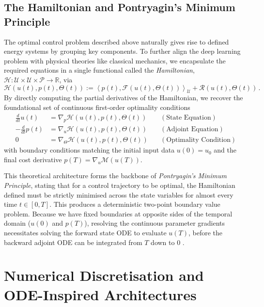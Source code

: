 \subsection{The Hamiltonian and Pontryagin's Minimum Principle}

The optimal control problem described above naturally gives rise to defined energy systems by grouping key components. To further align the deep learning problem with physical theories like classical mechanics, we encapsulate the required equations in a single functional called the \emph{Hamiltonian}, $\mathcal{H}: \mathcal{U} \times \mathcal{U} \times \mathcal{P} \to \mathbb{R}$, via
\begin{equation*}
    \mathcal{H}\left(u(t), p(t), \Theta(t)\right) := \left\langle p(t), \mathcal{F}\left(u(t), \Theta(t)\right) \right\rangle_{\mathcal{U}} + \mathcal{R}\left(u(t), \Theta(t)\right) \, .
\end{equation*}
By directly computing the partial derivatives of the Hamiltonian, we recover the foundational set of continuous first-order optimality conditions
\begin{align*}
    \frac{d}{dt} u(t) &= \nabla_p \mathcal{H}\left(u(t), p(t), \Theta(t)\right) &\quad (\text{State Equation}) \\
    -\frac{d}{dt} p(t) &= \nabla_u \mathcal{H}\left(u(t), p(t), \Theta(t)\right) &\quad (\text{Adjoint Equation}) \\
    0 &= \nabla_\Theta \mathcal{H}\left(u(t), p(t), \Theta(t)\right) &\quad (\text{Optimality Condition}) 
\end{align*}
with boundary conditions matching the initial input data $u(0) = u_0$ and the final cost derivative $p(T) = \nabla_u \mathcal{M}(u(T))$.

This theoretical architecture forms the backbone of \emph{Pontryagin's Minimum Principle}, stating that for a control trajectory to be optimal, the Hamiltonian defined must be strictly minimised across the state variables for almost every time $t \in [0, T]$. This produces a deterministic two-point boundary value problem. Because we have fixed boundaries at opposite sides of the temporal domain ($u(0)$ and $p(T)$), resolving the continuous parameter gradients necessitates solving the forward state ODE to evaluate $u(T)$, before the backward adjoint ODE can be integrated from $T$ down to $0$ \cite{benning2019deep}.

\section{Numerical Discretisation and ODE-Inspired Architectures}
\label{sec:numerical_discretisation}


